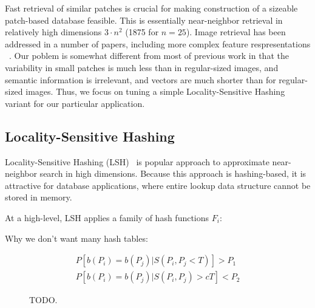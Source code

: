 

Fast retrieval of similar patches is crucial for making
construction of a sizeable patch-based database feasible.
This is essentially near-neighbor retrieval in
relatively high dimensions $3 \cdot n^2$ (1875 for $n=25$).
Image retrieval has been addressed in a number of papers,
including more complex feature respresentations ~\cite{perronnin2010large}.
Our poblem is somewhat different from most of previous work
in that the variability
in small patches is much less than in regular-sized images,
and semantic information is irrelevant, and vectors are much shorter
than for regular-sized images.
Thus, we focus on tuning
a simple Locality-Sensitive Hashing variant for our
particular application.

\subsection{Locality-Sensitive Hashing}

Locality-Sensitive Hashing (LSH)~\cite{LSH:Andoni}
is popular approach to approximate near-neighbor search
in high dimensions.
Because this approach is hashing-based, it is
attractive for database applications, where entire lookup data structure
cannot be stored in memory.

At a high-level, LSH applies a family of hash functions $F_i$:

Why we don't want many hash tables:

\begin{equation*}
\begin{aligned}
P[b(P_i) = b(P_j) | S(P_i, P_j < T)] > P_1\\
P[b(P_i) = b(P_j) | S(P_i, P_j) > cT] < P_2
\end{aligned}
\end{equation*}

\begin{figure}[ht!]
\centering
{}
\quad
{}
\caption{TODO.}
\label{fig:proj}
\end{figure}

